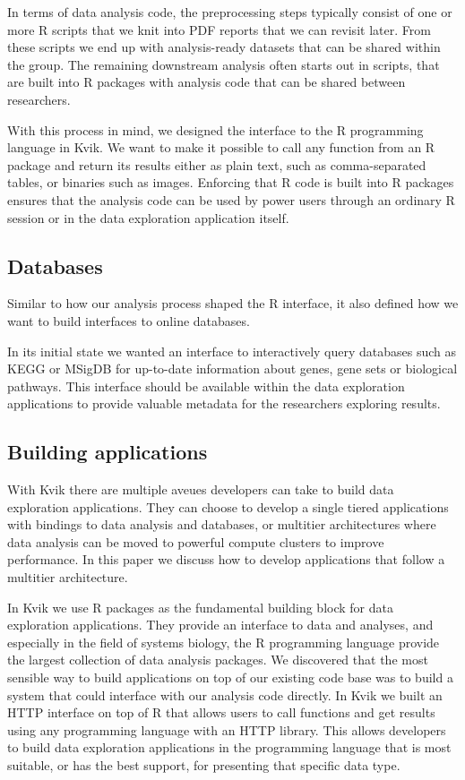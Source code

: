 In terms of data analysis code, the preprocessing steps typically consist of
one or more R scripts that we knit \cite{knitr} into PDF reports that we can
revisit later. From these scripts we end up with analysis-ready datasets that
can be shared within the group. The remaining downstream analysis often starts
out in scripts, that are built into R packages with analysis code that can be
shared between researchers. 

With this process in mind, we designed the interface to the R programming
language in Kvik. We want to make it possible to call any function from an R
package and return its results either as plain text, such as comma-separated
tables, or binaries such as images. Enforcing that R code is built into R
packages ensures that the analysis code can be used by power users through an
ordinary R session or in the data exploration application itself. 


\subsection*{Databases} 
Similar to how our analysis process shaped the R interface, it also defined how
we want to build interfaces to online databases. 

In its initial state we wanted an interface to interactively query databases
such as KEGG or MSigDB for up-to-date information about genes, gene sets or
biological pathways. This interface should be available within the data
exploration applications to provide valuable metadata for the researchers
exploring results.  

\subsection*{Building applications} 
With Kvik there are multiple aveues developers can take to build data
exploration applications. They can choose to develop a single tiered
applications with bindings to data analysis and databases, or
multitier architectures where data analysis can be moved to powerful compute
clusters to improve performance. In this paper we discuss how to develop
applications that follow a multitier architecture. 

In Kvik we use R packages as the fundamental building block for data exploration
applications. They provide an interface to data and analyses, and especially in
the field of systems biology, the R programming language provide the largest
collection of data analysis packages. %
We discovered that the most sensible way to build applications on top of our
existing code base was to build a system that could interface with our analysis
code directly. In Kvik we built an HTTP interface on top of R that allows users
to call functions and get results using any programming language with an HTTP
library. This allows developers to build data exploration applications in the
programming language that is most suitable, or has the best support, for
presenting that specific data type. 

